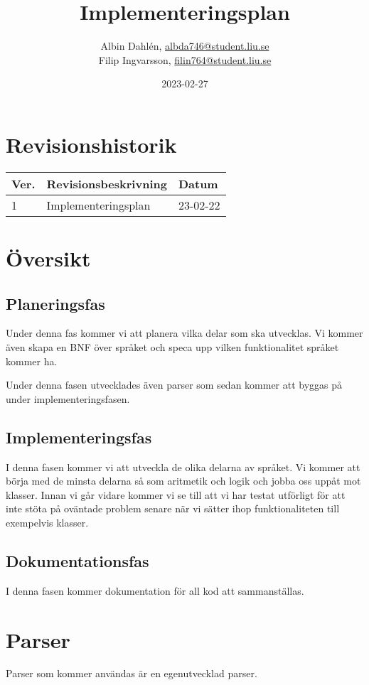\documentclass{TDP003mall}
\author{Albin Dahlén, \url{albda746@student.liu.se}\\
Filip Ingvarsson, \url{filin764@student.liu.se}}
\title{Implementeringsplan}
\date{2023-02-27}
\begin{document}
    \projectpage

    \tableofcontents

    \section*{Revisionshistorik}
    \begin{table}[!h]
        \begin{tabularx}{\linewidth}{|l|X|l|}
            \hline
            Ver. & Revisionsbeskrivning      & Datum    \\\hline
            1  & Implementeringsplan     & 23-02-22 \\\hline
        \end{tabularx}
    \end{table}

    \newpage


    \section{Översikt}

    \subsection{Planeringsfas}
    Under denna fas kommer vi att planera vilka delar som ska utvecklas.
    Vi kommer även skapa en BNF över språket och speca upp vilken funktionalitet språket kommer ha.
    
    Under denna fasen utvecklades även parser som sedan kommer att byggas på under implementeringsfasen.

    \subsection{Implementeringsfas}
    I denna fasen kommer vi att utveckla de olika delarna av språket.
    Vi kommer att börja med de minsta delarna så som aritmetik och logik och jobba oss uppåt mot klasser.
    Innan vi går vidare kommer vi se till att vi har testat utförligt för att inte stöta på oväntade problem senare när vi sätter ihop funktionaliteten till exempelvis klasser.

    \subsection{Dokumentationsfas}
    I denna fasen kommer dokumentation för all kod att sammanställas.

    \section{Parser}
    Parser som kommer användas är en egenutvecklad parser.
\end{document}
